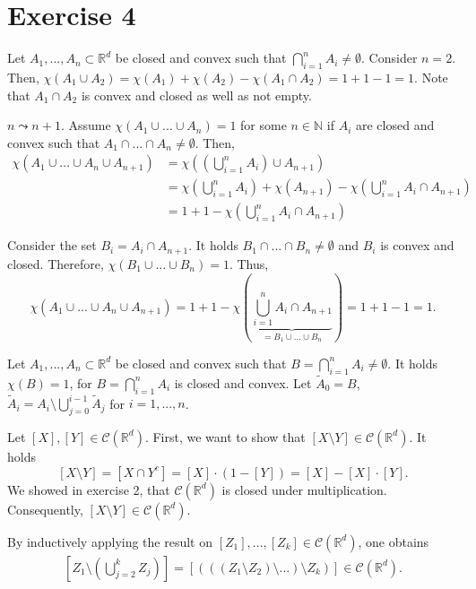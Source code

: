 \documentclass{article}
\begin{document}
\section*{Exercise 4}

Let $A_1,...,A_n \subset \mathbb R^d$ be closed and convex such that $\bigcap^n_{i=1} A_i \neq \emptyset$. Consider $n = 2$. Then, $\chi(A_1 \cup A_2) = \chi(A_1) + \chi(A_2) - \chi(A_1 \cap A_2) = 1 + 1 - 1 = 1$. Note that $A_1 \cap A_2$ is convex and closed as well as not empty.

$n \leadsto n+1$. Assume $\chi(A_1 \cup ... \cup A_n) = 1$ for some $n \in \mathbb N$ if $A_i$ are closed and convex such that $A_1 \cap ... \cap A_n \neq \emptyset$. Then, 
\begin{align*}
    \chi(A_1 \cup ... \cup A_n \cup A_{n+1}) &= \chi(\left(\bigcup^n_{i=1} A_i\right) \cup A_{n+1})\\
    &= \chi\left(\bigcup^n_{i=1} A_i\right) + \chi(A_{n+1}) - \chi(\bigcup^n_{i=1} A_i \cap A_{n+1}) \\
    &= 1 + 1 - \chi(\bigcup^n_{i=1} A_i \cap A_{n+1})
\end{align*}

Consider the set $B_i = A_i \cap A_{n+1}$. It holds $B_1 \cap ... \cap B_n \neq \emptyset$ and $B_i$ is convex and closed. Therefore, $\chi(B_1 \cup ... \cup B_n) = 1$. Thus, 
$$
\chi(A_1 \cup ... \cup A_n \cup A_{n+1})= 1 + 1 - \chi(\underbrace{\bigcup^n_{i=1} A_i \cap A_{n+1}}_{=B_1 \cup...\cup B_n})= 1+1-1 = 1.
$$
    
\iffalse
Let $A_1,...,A_n \subset \mathbb R^d$ be closed and convex such that $B = \bigcap^n_{i=1} A_i \neq \emptyset$. It holds $\chi(B) = 1$, for $B = \bigcap^n_{i=1} A_i$ is closed and convex. Let $\tilde A_0 = B$, $\tilde A_i = A_i \setminus \bigcup^{i-1}_{j=0}\tilde A_{j}$ for $i=1,...,n$. 

Let $[X],[Y] \in \mathcal C(\mathbb R^d)$. First, we want to show that $[X \setminus Y] \in \mathcal C(\mathbb R^d)$. It holds 
$$
    [X \setminus Y] = [X \cap Y^c] = [X] \cdot (1-[Y]) = [X] - [X] \cdot [Y].
$$ 
We showed in exercise 2, that $\mathcal C(\mathbb R^d)$ is closed under multiplication. Consequently, $[X \setminus Y] \in \mathcal C(\mathbb R^d)$. 

By inductively applying the result on $[Z_1],...,[Z_k] \in \mathcal C(\mathbb R^d)$, one obtains 
\begin{align}\label{krank}
    [Z_1 \setminus \left(\bigcup^{k}_{j=2} Z_j\right)] = [(((Z_1 \setminus Z_2) \setminus ...) \setminus Z_k)] \in \mathcal C(\mathbb R^d).
\end{align}
\end{document}
